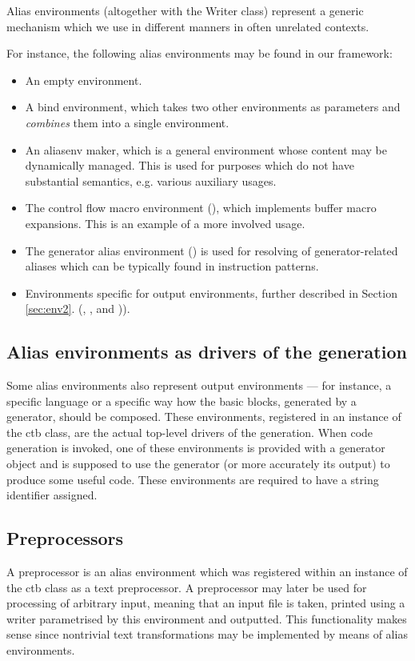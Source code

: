 Alias environments (altogether with the Writer class) represent a generic mechanism which we use in different manners in often unrelated contexts.

For instance, the following alias environments may be found in our framework:
\begin{itemize}
  \item An empty environment.
  \item A bind environment, which takes two other environments as parameters and \emph{combines} them into a single environment.
  \item An aliasenv maker, which is a general environment whose content may be dynamically managed. This is used for purposes which do not have substantial semantics, e.g. various auxiliary usages. 
  \item The control flow macro environment (), which implements buffer macro expansions. This is an example of a more involved usage.
  \item The generator alias environment () is used for resolving of generator-related aliases which can be typically found in instruction patterns.
  \item Environments specific for output environments, further described in Section \ref{sec:env2}.
    (, ,  and )). 
\end{itemize}

\subsection*{Alias environments as drivers of the generation}
  Some alias environments also represent output environments --- for instance, a specific language or a specific way how the basic blocks, generated by a generator, should be composed. These environments, registered in an instance of the ctb class, are the actual top-level drivers of the generation. When code generation is invoked, one of these environments is provided with a generator object and is supposed to use the generator (or more accurately its output) to produce some useful code. These environments are required to have a string identifier assigned.

\subsection*{Preprocessors}
  A preprocessor is an alias environment which was registered within an instance of the ctb class as a text preprocessor. A preprocessor may later be used for processing of arbitrary input, meaning that an input file is taken, printed using a writer parametrised by this environment and outputted. This functionality makes sense since nontrivial text transformations may be implemented by means of alias environments.

